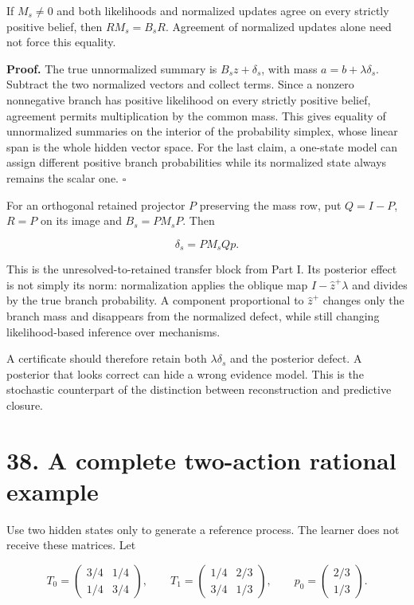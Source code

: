 \documentclass[11pt,letterpaper]{article}
\begin{document}
If \(M_s\neq0\) and both likelihoods and normalized updates agree on
every strictly positive belief, then \(RM_s=B_sR\). Agreement of
normalized updates alone need not force this equality.

\textbf{Proof.} The true unnormalized summary is \(B_sz+\delta_s\), with
mass \(a=b+\lambda\delta_s\). Subtract the two normalized vectors and
collect terms. Since a nonzero nonnegative branch has positive
likelihood on every strictly positive belief, agreement permits
multiplication by the common mass. This gives equality of unnormalized
summaries on the interior of the probability simplex, whose linear span
is the whole hidden vector space. For the last claim, a one-state model
can assign different positive branch probabilities while its normalized
state always remains the scalar one. \(\square\)

For an orthogonal retained projector \(P\) preserving the mass row, put
\(Q=I-P\), \(R=P\) on its image and \(B_s=PM_sP\). Then

\[
\delta_s=PM_sQp.
\]

This is the unresolved-to-retained transfer block from Part I. Its
posterior effect is not simply its norm: normalization applies the
oblique map \(I-\widehat z^+\lambda\) and divides by the true branch
probability. A component proportional to \(\widehat z^+\) changes only
the branch mass and disappears from the normalized defect, while still
changing likelihood-based inference over mechanisms.

A certificate should therefore retain both \(\lambda\delta_s\) and the
posterior defect. A posterior that looks correct can hide a wrong
evidence model. This is the stochastic counterpart of the distinction
between reconstruction and predictive closure.

\section{38. A complete two-action rational
example}\label{a-complete-two-action-rational-example}

Use two hidden states only to generate a reference process. The learner
does not receive these matrices. Let

\[
T_0=\begin{pmatrix}3/4&1/4\\1/4&3/4\end{pmatrix},\qquad
T_1=\begin{pmatrix}1/4&2/3\\3/4&1/3\end{pmatrix},\qquad
p_0=\begin{pmatrix}2/3\\1/3\end{pmatrix}.
\]
\end{document}
